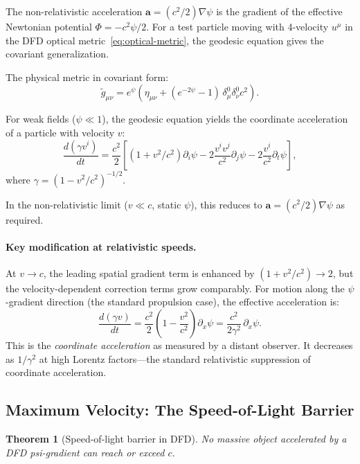 \documentclass[aps,prd,twocolumn,superscriptaddress,nofootinbib]{revtex4-2}
\newtheorem{theorem}{Theorem}
\newcommand{\avec}{\bm{a}}
\begin{document}
The non-relativistic acceleration $\avec = (c^2/2)\nabla\psi$ is the
gradient of the effective Newtonian potential $\Phi = -c^2\psi/2$.
For a test particle moving with 4-velocity $u^\mu$ in the DFD
optical metric~\eqref{eq:optical-metric}, the geodesic equation gives
the covariant generalization.

The physical metric in covariant form:
\begin{equation}
\tilde{g}_{\mu\nu} = e^{\psi}\left(\eta_{\mu\nu}
+ (e^{-2\psi} - 1)\,\delta^0_\mu\delta^0_\nu c^2\right).
\end{equation}

For weak fields ($\psi \ll 1$), the geodesic equation yields the
coordinate acceleration of a particle with velocity $v$:
\begin{equation}\label{eq:rel-accel}
\frac{d(\gamma v^i)}{dt} = \frac{c^2}{2}\left[
(1 + v^2/c^2)\partial_i\psi - 2\frac{v^i v^j}{c^2}\partial_j\psi
- 2\frac{v^i}{c^2}\partial_t\psi
\right],
\end{equation}
where $\gamma = (1 - v^2/c^2)^{-1/2}$.

In the non-relativistic limit ($v \ll c$, static $\psi$), this
reduces to $\avec = (c^2/2)\nabla\psi$ as required.

\paragraph{Key modification at relativistic speeds.}
At $v \to c$, the leading spatial gradient term is enhanced by
$(1 + v^2/c^2) \to 2$, but the velocity-dependent correction terms
grow comparably.  For motion along the $\psi$-gradient direction
(the standard propulsion case), the effective acceleration is:
\begin{equation}\label{eq:rel-accel-along}
\frac{d(\gamma v)}{dt} = \frac{c^2}{2}\left(1 - \frac{v^2}{c^2}\right)
\partial_x\psi = \frac{c^2}{2\gamma^2}\,\partial_x\psi.
\end{equation}
This is the \textit{coordinate acceleration} as measured by a distant
observer.  It decreases as $1/\gamma^2$ at high Lorentz factors---the
standard relativistic suppression of coordinate acceleration.

\subsection{Maximum Velocity: The Speed-of-Light Barrier}

\begin{theorem}[Speed-of-light barrier in DFD]
\label{thm:speed-limit}
No massive object accelerated by a DFD psi-gradient can reach or
exceed $c$.
\end{theorem}
\end{document}
